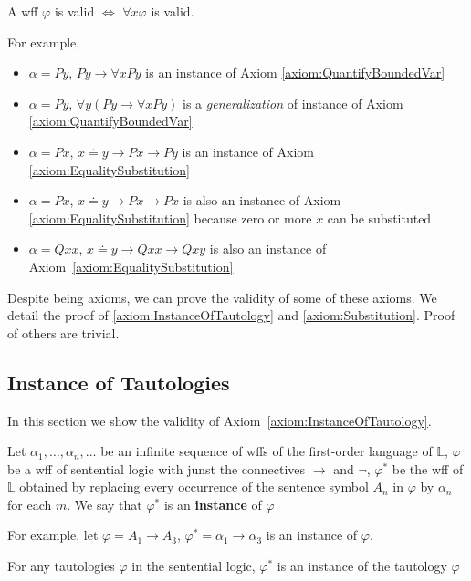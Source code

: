 \begin{lemma}
    A wff $\varphi$ is valid $\iff$ $\forall{x}\varphi$ is valid.
\end{lemma}

For example,

\begin{itemize}
    \item $\alpha=Py$, $Py \to \forall x Py$ is an instance of Axiom \ref{axiom:QuantifyBoundedVar}
    \item $\alpha=Py$, $\forall y(Py\to \forall xPy)$ is a \emph{generalization} of instance of Axiom \ref{axiom:QuantifyBoundedVar}
    \item $\alpha = Px$, $x \doteq y \to Px\to Py$ is an instance of Axiom \ref{axiom:EqualitySubstitution}
    \item $\alpha = Px$, $x \doteq y \to Px \to Px$ is also an instance of Axiom \ref{axiom:EqualitySubstitution} because zero or more $x$ can be substituted
    \item $\alpha = Qxx$, $x\doteq y \to Qxx \to Qxy$ is also an instance of Axiom~\ref{axiom:EqualitySubstitution}
\end{itemize}

Despite being axioms, we can prove the validity of some of these axioms. We detail the proof of \ref{axiom:InstanceOfTautology} and \ref{axiom:Substitution}. Proof of others are trivial.

\subsection{Instance of Tautologies}

In this section we show the validity of Axiom~\ref{axiom:InstanceOfTautology}.

\begin{definition}
    Let $\alpha_1,\dots,\alpha_n,\dots$ be an infinite sequence of wffs of the first-order language of $\mathbb{L}$, $\varphi$ be a wff of sentential logic with junst the connectives $\to$ and $\neg$, $\varphi^\ast$ be the wff of $\mathbb{L}$ obtained by replacing every occurrence of the sentence symbol $A_n$ in $\varphi$ by $\alpha_n$ for each $m$. We say that $\varphi^\ast$ is an \textbf{instance} of $\varphi$
\end{definition}

For example, let $\varphi=A_1\to A_3$, $\varphi^\ast = \alpha_1 \to \alpha_3$ is an instance of $\varphi$.

\begin{definition}
    For any tautologies $\varphi$ in the sentential logic, $\varphi^\ast$ is an instance of the tautology $\varphi$
\end{definition}

